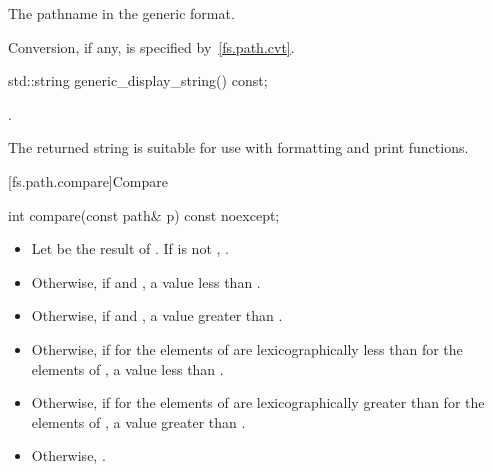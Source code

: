 \begin{itemdescr}
\pnum
\returns
The pathname in the generic format.

\pnum
\remarks
Conversion, if any, is specified by~\ref{fs.path.cvt}.
\end{itemdescr}

%
\begin{itemdecl}
std::string generic_display_string() const;
\end{itemdecl}

\begin{itemdescr}
\pnum
\returns
{}.
\begin{note}
The returned string is suitable for use with formatting
and print functions.
\end{note}
\end{itemdescr}

[fs.path.compare]{Compare}

%
\begin{itemdecl}
int compare(const path& p) const noexcept;
\end{itemdecl}

\begin{itemdescr}
\pnum
\returns
\begin{itemize}
\item
  Let  be the result of
  .
  If  is not ,
  .
\item
  Otherwise, if
   and ,
  a value less than .
\item
  Otherwise, if
   and ,
  a value greater than .
\item
  Otherwise, if
   for the elements of 
  are lexicographically less than
   for the elements of ,
  a value less than .
\item
  Otherwise, if
   for the elements of 
  are lexicographically greater than
   for the elements of ,
  a value greater than .
\item
  Otherwise, .
\end{itemize}
\end{itemdescr}

